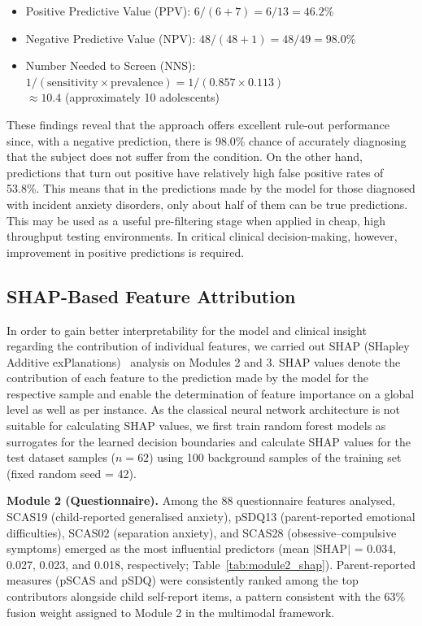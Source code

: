 \documentclass[10pt,letterpaper]{article}
\begin{document}
\begin{itemize}
    \item Positive Predictive Value (PPV): $6/(6+7)=6/13=46.2\%$
    \item Negative Predictive Value (NPV): $48/(48+1)=48/49=98.0\%$
    \item Number Needed to Screen (NNS):
          $1/(\mathrm{sensitivity}\times\mathrm{prevalence}) = 1/(0.857\times0.113)$\\
          $\approx 10.4$ (approximately 10 adolescents)
\end{itemize}

These findings reveal that the approach offers excellent rule-out performance since, with a negative prediction, there is 98.0\% chance of accurately diagnosing that the subject does not suffer from the condition. On the other hand, predictions that turn out positive have relatively high false positive rates of 53.8\%. This means that in the predictions made by the model for those diagnosed with incident anxiety disorders, only about half of them can be true predictions. This may be used as a useful pre-filtering stage when applied in cheap, high throughput testing environments. In critical clinical decision-making, however, improvement in positive predictions is required.
\subsection*{SHAP-Based Feature Attribution}

In order to gain better interpretability for the model and clinical insight regarding the contribution of individual features, we carried out SHAP (SHapley Additive exPlanations)~\cite{ref_shap} analysis on Modules 2 and 3. SHAP values denote the contribution of each feature to the prediction made by the model for the respective sample and enable the determination of feature importance on a global level as well as per instance. As the classical neural network architecture is not suitable for calculating SHAP values, we first train random forest models as surrogates for the learned decision boundaries and calculate SHAP values for the test dataset samples ($n = 62$) using 100 background samples of the training set (fixed random seed = 42).

\textbf{Module 2 (Questionnaire).} Among the 88 questionnaire features analysed, SCAS19 (child-reported generalised anxiety), pSDQ13 (parent-reported emotional difficulties), SCAS02 (separation anxiety), and SCAS28 (obsessive--compulsive symptoms) emerged as the most influential predictors (mean $|\mathrm{SHAP}|$ = 0.034, 0.027, 0.023, and 0.018, respectively; Table~\ref{tab:module2_shap}). Parent-reported measures (pSCAS and pSDQ) were consistently ranked among the top contributors alongside child self-report items, a pattern consistent with the 63\% fusion weight assigned to Module 2 in the multimodal framework.
\end{document}
